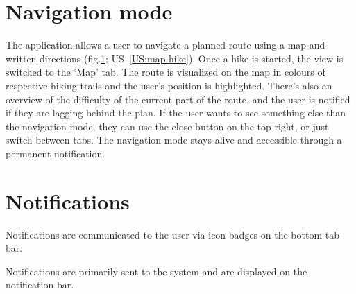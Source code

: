 \section{Navigation mode}
The application allows a user to navigate a planned route using a map and written directions (fig.\ref{fig:navigation}; US~\ref{US:map-hike}).
Once a hike is started, the view is switched to the `Map' tab.
The route is visualized on the map in colours of respective hiking trails and the user's position is highlighted.
There's also an overview of the difficulty of the current part of the route, and the user is notified if they are lagging behind the plan.
If the user wants to see something else than the navigation mode, they can use the close button on the top right, or just switch between tabs.
The navigation mode stays alive and accessible through a permanent notification.

\begin{figure}[h!]
    \centering
    \label{fig:navigation}
\end{figure}

\section{Notifications}
Notifications are communicated to the user via icon badges on the bottom tab bar.

Notifications are primarily sent to the system and are displayed on the notification bar.
